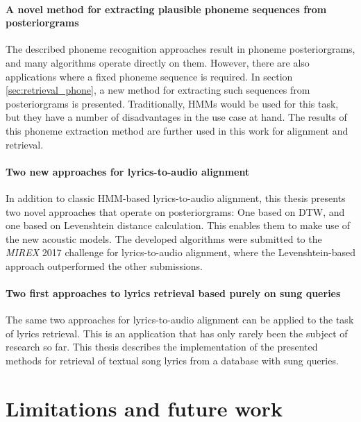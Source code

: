 \paragraph{A novel method for extracting plausible phoneme sequences from posteriorgrams}
The described phoneme recognition approaches result in phoneme posteriorgrams, and many algorithms operate directly on them. However, there are also applications where a fixed phoneme sequence is required. In section \ref{sec:retrieval_phone}, a new method for extracting such sequences from posteriorgrams is presented. Traditionally, HMMs would be used for this task, but they have a number of disadvantages in the use case at hand. The results of this phoneme extraction method are further used in this work for alignment and retrieval.

\paragraph{Two new approaches for lyrics-to-audio alignment}
In addition to classic HMM-based lyrics-to-audio alignment, this thesis presents two novel approaches that operate on posteriorgrams: One based on DTW, and one based on Levenshtein distance calculation. This enables them to make use of the new acoustic models. The developed algorithms were submitted to the \textit{MIREX} 2017 challenge for lyrics-to-audio alignment, where the Levenshtein-based approach outperformed the other submissions.

\paragraph{Two first approaches to lyrics retrieval based purely on sung queries}
The same two approaches for lyrics-to-audio alignment can be applied to the task of lyrics retrieval. This is an application that has only rarely been the subject of research so far. This thesis describes the implementation of the presented methods for retrieval of textual song lyrics from a database with sung queries.


\section{Limitations and future work}

